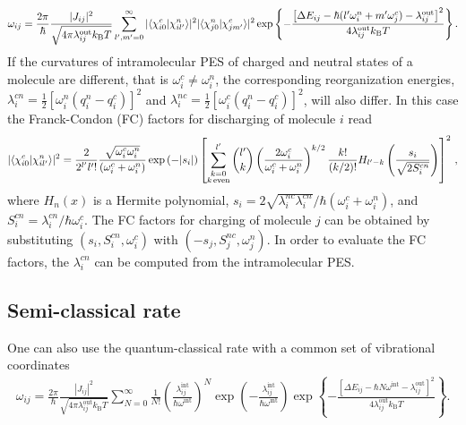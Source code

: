 \begin{align}
 \omega_{ij}= \frac{2\pi}{\hbar}  \frac{|J_{ij}|^2}{\sqrt{4\pi \lambda_{ij}^\text{out} k_\text{B}T}}
 \sum_{l',m'=0}^\infty
 |\langle \chi_{i0}^c |\chi_{il'}^n \rangle|^2 |\langle \chi_{j0}^n |\chi_{jm'}^c \rangle|^2
\exp
\left\{ -\frac{ \left[ \Delta E_{ij}-\hbar(l'\omega_i^n+m'\omega_j^c) -\lambda_{ij}^\text{out} \right]^2}{4\lambda_{ij}^\text{out} k_\text{B}T}
\right\} .
\label{equ:jjortner}
\end{align}
If the curvatures of intramolecular PES of charged and neutral states of a molecule are different, that is $\omega_i^c\neq\omega_i^n$, the corresponding reorganization energies, $\lambda_i^{cn}=\frac{1}{2}[\omega_i^n(q_i^n-q_i^c)]^2$ and $\lambda_i^{nc}=\frac{1}{2}[\omega_i^c(q_i^n-q_i^c)]^2$, will also differ. In this case the Franck-Condon (FC) factors for discharging of molecule $i$ read \cite{chang_new_2005}
\begin{align}
|\langle \chi_{i0}^c |\chi_{il'}^n \rangle|^2 =
\frac{2}{2^{l'}l'!} \frac{\sqrt{\omega_i^c\omega_i^n}}{(\omega_i^c+\omega_i^n)} \exp\left( -|s_i| \right)
 \left[ \sum_{\substack{k=0\\k\,\text{even}}}^{l'} {l' \choose k}
\left( \frac{2 \omega_i^c }{\omega_i^c+\omega_i^n}\right)^{k/2} \frac{k!}{(k/2)!}
H_{l'-k} \left( \frac{s_{i}}{\sqrt{2S^{cn}_i}}\right)
\right]^2
\, ,
\end{align}
where $H_n(x)$ is a Hermite polynomial, $s_i=2\sqrt{\lambda_i^{nc}\lambda_i^{cn}} / \hbar(\omega_i^c+\omega_i^n)$, and $S^{cn}_i=\lambda_i^{cn}/\hbar\omega_i^c$. The FC factors for charging of molecule $j$ can be obtained by substituting $(s_i,S^{cn}_i,\omega_i^c)$ with $(-s_j,S^{nc}_j, \omega_j^n)$. In order to evaluate the FC factors, the  $\lambda_i^{cn}$ can be computed from the intramolecular PES.

\subsection{Semi-classical rate}
\label{sec:rate_semiclassical}

One can also use the quantum-classical rate with a common set of vibrational coordinates~\cite{may_charge_2003}
\begin{align}
 \omega_{ij} = \frac{2\pi}{\hbar}  \frac{|J_{ij}|^2}{\sqrt{4\pi \lambda_{ij}^\text{out} k_\text{B}T}}
 \sum_{N=0}^\infty \frac{1}{N!} \left( \frac{\lambda_{ij}^\text{int}}{\hbar\omega^\text{int}} \right)^{N}
  \exp \left( - \frac{\lambda_{ij}^\text{int}}{\hbar\omega^\text{int}}\right)
\exp
\left\{ -\frac{ \left[ \Delta E_{ij}-\hbar N\omega^\text{int} -\lambda_{ij}^\text{out} \right]^2}{4\lambda_{ij}^\text{out} k_\text{B}T}
\right\} .
\label{equ:jortner}
\end{align}

